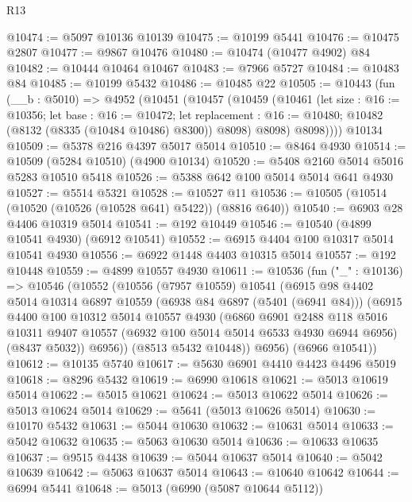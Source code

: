 \begin{lexlean}{R13}
\begin{coremodule}
@10474 := @5097 @10136 @10139
@10475 := @10199 @5441
@10476 := @10475 @2807
@10477 := @9867 @10476
@10480 := @10474 (@10477 @4902) @84
@10482 := @10444 @10464 @10467
@10483 := @7966 @5727
@10484 := @10483 @84
@10485 := @10199 @5432
@10486 := @10485 @22
@10505 := @10443
    (fun (__b : @5010) =>
    @4952
      (@10451
        (@10457
          (@10459
            (@10461
              (let size : @16 := @10356;
              let base : @16 := @10472;
              let replacement : @16 := @10480; @10482 (@8132 (@8335 (@10484 @10486) @8300)) @8098)
              @8098)
            @8098))))
    @10134
@10509 := @5378 @216 @4397 @5017 @5014
@10510 := @8464 @4930
@10514 := @10509 (@5284 @10510) (@4900 @10134)
@10520 := @5408 @2160 @5014 @5016 @5283 @10510 @5418
@10526 := @5388 @642 @100 @5014 @5014 @641 @4930
@10527 := @5514 @5321
@10528 := @10527 @11
@10536 := @10505 (@10514 (@10520 (@10526 (@10528 @641) @5422)) (@8816 @640))
@10540 := @6903 @28 @4406 @10319 @5014
@10541 := @192 @10449
@10546 := @10540 (@4899 @10541 @4930) (@6912 @10541)
@10552 := @6915 @4404 @100 @10317 @5014 @10541 @4930
@10556 := @6922 @1448 @4403 @10315 @5014
@10557 := @192 @10448
@10559 := @4899 @10557 @4930
@10611 := @10536
    (fun ("_" : @10136) =>
    @10546
      (@10552
        (@10556
          (@7957 @10559)
          @10541
          (@6915
            @98
            @4402
            @5014
            @10314
            @6897
            @10559
            (@6938 @84 @6897 (@5401 (@6941 @84)))
            (@6915
              @4400
              @100
              @10312
              @5014
              @10557
              @4930
              (@6860
                @6901
                @2488
                @118
                @5016
                @10311
                @9407
                @10557
                (@6932 @100 @5014 @5014 @6533 @4930 @6944 @6956)
                (@8437 @5032))
              @6956))
          (@8513 @5432 @10448))
        @6956)
      (@6966 @10541))
@10612 := @10135 @5740
@10617 := @5630 @6901 @4410 @4423 @4496 @5019
@10618 := @8296 @5432
@10619 := @6990 @10618
@10621 := @5013 @10619 @5014
@10622 := @5015 @10621
@10624 := @5013 @10622 @5014
@10626 := @5013 @10624 @5014
@10629 := @5641 (@5013 @10626 @5014)
@10630 := @10170 @5432
@10631 := @5044 @10630
@10632 := @10631 @5014
@10633 := @5042 @10632
@10635 := @5063 @10630 @5014
@10636 := @10633 @10635
@10637 := @9515 @4438
@10639 := @5044 @10637 @5014
@10640 := @5042 @10639
@10642 := @5063 @10637 @5014
@10643 := @10640 @10642
@10644 := @6994 @5441
@10648 := @5013 (@6990 (@5087 @10644 @5112))

\end{coremodule}
\end{lexlean}
